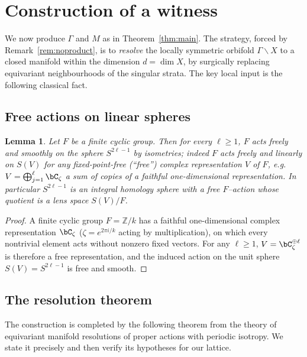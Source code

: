 \documentclass[12pt]{article}
\newcommand{\bZ}{\mathbb{Z}}
\newtheorem{lemma}{Lemma}
\theoremstyle{definition}
\begin{document}
\section{Construction of a witness}\label{sec:construction}

We now produce $\Gamma$ and $M$ as in Theorem~\ref{thm:main}.  The strategy,
forced by Remark~\ref{rem:noproduct}, is to \emph{resolve} the locally symmetric
orbifold $\Gamma\backslash X$ to a closed manifold within the dimension
$d=\dim X$, by surgically replacing equivariant neighbourhoods of the singular
strata.  The key local input is the following classical fact.

\subsection{Free actions on linear spheres}

\begin{lemma}\label{lem:cyclicfree}
Let $F$ be a finite \emph{cyclic} group.  Then for every $\ell\ge1$, $F$ acts
freely and smoothly on the sphere $S^{2\ell-1}$ by isometries; indeed $F$ acts
freely and linearly on $S(V)$ for any fixed-point-free (``free'') complex
representation $V$ of $F$, e.g.\ $V=\bigoplus_{j=1}^\ell\bC_{\zeta}$ a sum of
copies of a faithful one-dimensional representation.  In particular $S^{2\ell-1}$
is an integral homology sphere with a free $F$--action whose quotient is a lens
space $S(V)/F$.
\end{lemma}

\begin{proof}
A finite cyclic group $F=\bZ/k$ has a faithful one-dimensional complex
representation $\bC_\zeta$ ($\zeta=e^{2\pi i/k}$ acting by multiplication), on
which every nontrivial element acts without nonzero fixed vectors.  For any
$\ell\ge1$, $V=\bC_\zeta^{\oplus\ell}$ is therefore a free representation, and the
induced action on the unit sphere $S(V)=S^{2\ell-1}$ is free and smooth.
\end{proof}

\subsection{The resolution theorem}

The construction is completed by the following theorem from the theory of
equivariant manifold resolutions of proper actions with periodic isotropy.  We
state it precisely and then verify its hypotheses for our lattice.
\end{document}
